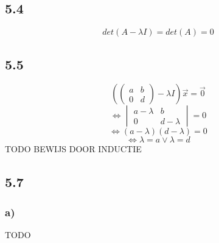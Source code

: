 \documentclass[11pt]{article}
\begin{document}
\subsection*{5.4}
\[
det(A-\lambda I)=det(A) = 0
\]

\subsection*{5.5}
\[\left(
\begin{pmatrix}
a & b \\
0 & d
\end{pmatrix}
-\lambda I \right)\vec{x} = \vec{0}
\]
\[
\Leftrightarrow
\begin{vmatrix}
a-\lambda & b \\
0 & d-\lambda
\end{vmatrix}
=0
\]
\[
\Leftrightarrow
(a-\lambda)(d-\lambda) = 0
\]
\[
\Leftrightarrow
\lambda=a \vee \lambda=d
\]
TODO BEWIJS DOOR INDUCTIE

\subsection*{5.7}
\subsubsection*{a)}
TODO
\end{document}
